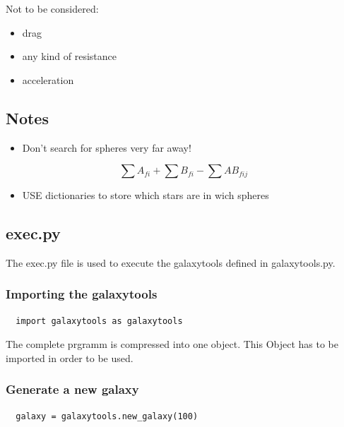 Not to be considered:
\begin{itemize}
  \item drag
  \item any kind of resistance
  \item acceleration
\end{itemize}

\subsection{Notes}

\begin{itemize}
  \item Don't search for spheres very far away!
\end{itemize}

\begin{equation}
  \sum A_{fi} + \sum B_{fi} - \sum AB_{fij}
\end{equation}

\begin{itemize}
  \item USE dictionaries to store which stars are in wich spheres
\end{itemize}

\subsection{exec.py}

The exec.py file is used to execute the galaxytools defined in galaxytools.py.

\subsubsection{Importing the galaxytools}

\begin{lstlisting}
  import galaxytools as galaxytools
\end{lstlisting}

The complete prgramm is compressed into one object. This Object has to be
imported in order to be used.

\subsubsection{Generate a new galaxy}

\begin{lstlisting}
  galaxy = galaxytools.new_galaxy(100)
\end{lstlisting}

